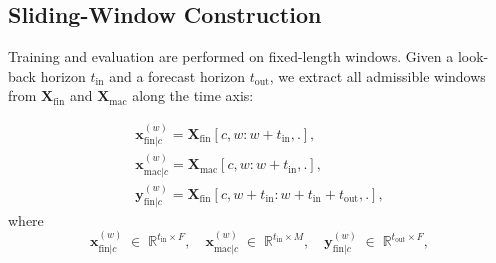 \documentclass[a4paper,fleqn]{cas-dc}
\newcommand{\nauel}[1]{{\color{orange}{\textbf{Nauel}: #1}}}
\newcommand{\paola}[1]{{\color{blue}{\textbf{Paola}: #1}}}
\begin{document}
\subsection{Sliding-Window Construction}
Training and evaluation are performed on fixed-length windows.  Given a look-back
horizon $t_{\mathrm{in}}$ and a forecast horizon $t_{\mathrm{out}}$, we extract all admissible windows
from $\mathbf{X}_{\mathrm{fin}}$ and $\mathbf{X}_{\mathrm{mac}}$ along the time axis: 

\begin{align}
  \textbf{x}_{\mathrm{fin} | c}^{(w)} =  \mathbf{X}_{\mathrm{fin}}[c, w : w{+}t_{\mathrm{in}}, .],\\
  \mathbf{x}_{\mathrm{mac}| c}^{(w)} = \mathbf{X}_{\mathrm{mac}}[c,w : w{+}t_{\mathrm{in}},.],\\
  \mathbf{y}_{\mathrm{fin}| c}^{(w)} = \mathbf{X}_{\mathrm{fin}}[c, w{+}t_{\mathrm{in}} : w{+}t_{\mathrm{in}}{+}t_{\mathrm{out}}, .],
\end{align}
where 
\begin{equation*}
   \textbf{x}_{\mathrm{fin} | c}^{(w)}   \;\in\; \mathbb{R}^{t_{\mathrm{in}} \times F}, \quad 
   \textbf{x}_{\mathrm{mac} | c}^{(w)}   \;\in\; \mathbb{R}^{t_{\mathrm{in}} \times M}, \quad
   \textbf{y}_{\mathrm{fin} | c}^{(w)}   \;\in\; \mathbb{R}^{t_{\mathrm{out}} \times F}, 
\end{equation*}
\end{document}

